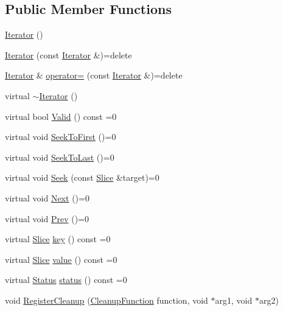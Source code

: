 \subsection*{Public Member Functions}
\begin{DoxyCompactItemize}
\item 
\mbox{\hyperlink{classleveldb_1_1_iterator_a1dc1cbc893e55a3fc990f08cf191480a}{Iterator}} ()
\item 
\mbox{\hyperlink{classleveldb_1_1_iterator_abe49ca39e162abccbfd1f0582a14354b}{Iterator}} (const \mbox{\hyperlink{classleveldb_1_1_iterator}{Iterator}} \&)=delete
\item 
\mbox{\hyperlink{classleveldb_1_1_iterator}{Iterator}} \& \mbox{\hyperlink{classleveldb_1_1_iterator_aa893453777013b3a7b9367b605076111}{operator=}} (const \mbox{\hyperlink{classleveldb_1_1_iterator}{Iterator}} \&)=delete
\item 
virtual \mbox{\hyperlink{classleveldb_1_1_iterator_a19904cc809b8eb7b3afcddcc38343fa5}{$\sim$\+Iterator}} ()
\item 
virtual bool \mbox{\hyperlink{classleveldb_1_1_iterator_a38614978bfa0586327b8e237bcb46012}{Valid}} () const =0
\item 
virtual void \mbox{\hyperlink{classleveldb_1_1_iterator_a3594967cf26ddf1d37c7b886bb48627e}{Seek\+To\+First}} ()=0
\item 
virtual void \mbox{\hyperlink{classleveldb_1_1_iterator_a8ad637f0a759e6d94cca6c5b4db440d3}{Seek\+To\+Last}} ()=0
\item 
virtual void \mbox{\hyperlink{classleveldb_1_1_iterator_a97a556e97ded60c677fbf4de7321ec44}{Seek}} (const \mbox{\hyperlink{classleveldb_1_1_slice}{Slice}} \&target)=0
\item 
virtual void \mbox{\hyperlink{classleveldb_1_1_iterator_aea54a5ca7eb942eb15770820529410e7}{Next}} ()=0
\item 
virtual void \mbox{\hyperlink{classleveldb_1_1_iterator_a28798d802a203788587dc6adc5bc729e}{Prev}} ()=0
\item 
virtual \mbox{\hyperlink{classleveldb_1_1_slice}{Slice}} \mbox{\hyperlink{classleveldb_1_1_iterator_ad17feced6e24a1b21db5ae6940c1f220}{key}} () const =0
\item 
virtual \mbox{\hyperlink{classleveldb_1_1_slice}{Slice}} \mbox{\hyperlink{classleveldb_1_1_iterator_a613ac2e965518aad7a064c64c72bcf7c}{value}} () const =0
\item 
virtual \mbox{\hyperlink{classleveldb_1_1_status}{Status}} \mbox{\hyperlink{classleveldb_1_1_iterator_ac84f34623a031b7eeb23409320f76376}{status}} () const =0
\item 
void \mbox{\hyperlink{classleveldb_1_1_iterator_a8c0281f9e4a2c9dceb37aad8128b636f}{Register\+Cleanup}} (\mbox{\hyperlink{classleveldb_1_1_iterator_aefcc7b475ddca596fe2429a2976e7730}{Cleanup\+Function}} function, void $\ast$arg1, void $\ast$arg2)
\end{DoxyCompactItemize}


